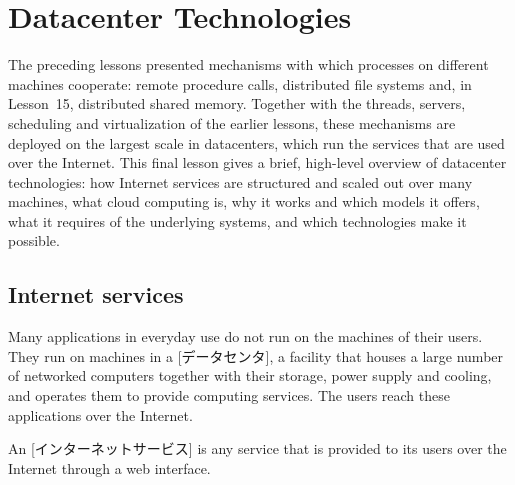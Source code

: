 \documentclass[../main.tex]{subfiles}
\begin{document}
\chapter{Datacenter Technologies}

The preceding lessons presented mechanisms with which processes on
different machines cooperate: remote procedure calls, distributed file
systems and, in Lesson~15, distributed shared memory.  Together with the
threads, servers, scheduling and virtualization of the earlier lessons,
these mechanisms are deployed on the largest scale in datacenters, which run
the services that are used over the Internet.  This final lesson gives a
brief, high-level overview of datacenter technologies: how Internet services
are structured and scaled out over many machines, what cloud computing is,
why it works and which models it offers, what it requires of the underlying
systems, and which technologies make it possible.

\section{Internet services}
\label{sec:l16-services}

Many applications in everyday use do not run on the machines of their
users.  They run on
machines in a [データセンタ], a facility that houses a
large number of networked computers together with their storage, power
supply and cooling, and operates them to provide computing services.  The
users reach these applications over the Internet.

\begin{definition}
  An [インターネットサービス] is any service that is
  provided to its users over the Internet through a web interface.
\end{definition}
\end{document}
